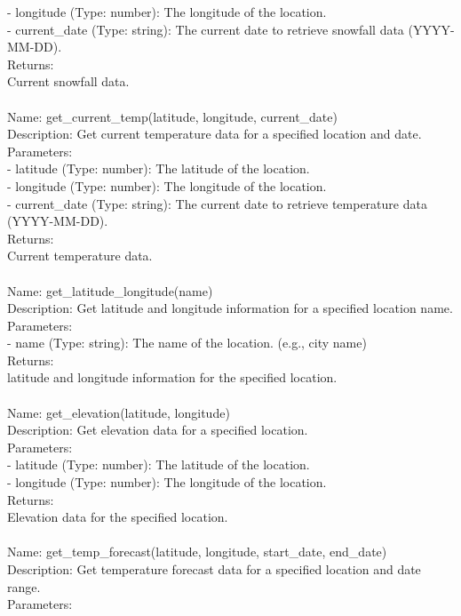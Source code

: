 \begin{tcolorbox}[breakable,title=Prompt Details for Weather]
- longitude (Type: number): The longitude of the location.\\
- current\_date (Type: string): The current date to retrieve snowfall data (YYYY-MM-DD).\\
Returns:\\
Current snowfall data.\\
\\
Name: get\_current\_temp(latitude, longitude, current\_date)\\
Description: Get current temperature data for a specified location and date.\\
Parameters:\\
- latitude (Type: number): The latitude of the location.\\
- longitude (Type: number): The longitude of the location.\\
- current\_date (Type: string): The current date to retrieve temperature data (YYYY-MM-DD).\\
Returns:\\
Current temperature data.\\
\\
Name: get\_latitude\_longitude(name)\\
Description: Get latitude and longitude information for a specified location name.\\
Parameters:\\
- name (Type: string): The name of the location. (e.g., city name)\\
Returns:\\
latitude and longitude information for the specified location.\\
\\
Name: get\_elevation(latitude, longitude)\\
Description: Get elevation data for a specified location.\\
Parameters:\\
- latitude (Type: number): The latitude of the location.\\
- longitude (Type: number): The longitude of the location.\\
Returns:\\
Elevation data for the specified location.\\
\\
Name: get\_temp\_forecast(latitude, longitude, start\_date, end\_date)\\
Description: Get temperature forecast data for a specified location and date range.\\
Parameters:\\

\end{tcolorbox}
